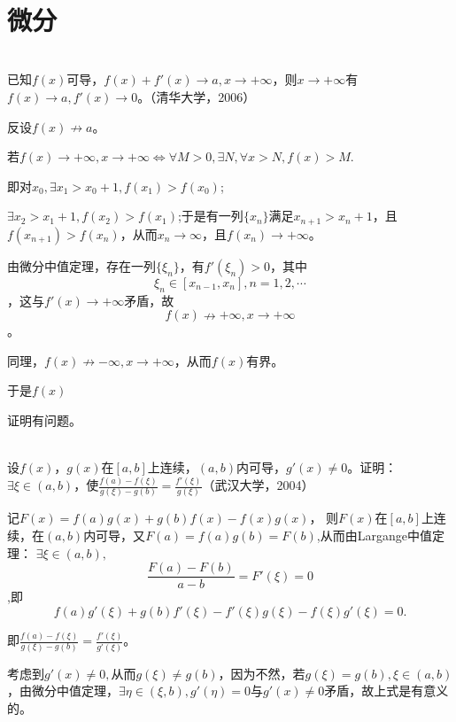   \hfill\\



\section{微分}
  \begin{example}
  \hfill\\
   已知$f(x)$可导，$f(x)+f'(x)\rightarrow a,x\rightarrow+\infty$，则$x\rightarrow+\infty$有$f(x)\rightarrow a,f'(x)\rightarrow0$。（清华大学，2006）
  
  反设$f(x)\nrightarrow a$。
  
  若$f(x)\rightarrow+\infty,x\rightarrow+\infty\Leftrightarrow\forall M>0,\exists N,\forall x>N,f(x)>M.$
  
  即对$x_0,\exists x_1>x_0+1,f(x_1)>f(x_0)$;
  
  $\exists x_2>x_1+1,f(x_2)>f(x_1)$;于是有一列$\{x_n\}$满足$x_{n+1}>x_n+1$，且$f(x_{n+1})>f(x_n)$，从而$x_n\rightarrow\infty$，且$f(x_n)\rightarrow+\infty$。
  
  由微分中值定理，存在一列$\{\xi_n\}$，有$f'(\xi_n)>0$，其中$$\xi_n\in[x_{n-1},x_n],n=1,2,\cdots$$，这与$f'(x)\rightarrow+\infty$矛盾，故$$f(x)\nrightarrow+\infty,x\rightarrow+\infty$$。
  
  同理，$f(x)\nrightarrow-\infty,x\rightarrow+\infty$，从而$f(x)$有界。
  
  于是$f(x)$
  
  证明有问题。
  \end{example}
  \begin{example}
  \hfill\\
   设$f(x)$，$g(x)$在$[a,b]$上连续，$(a,b)$内可导，$g'(x)\neq0$。证明：$\exists\xi\in(a,b)$，使$\frac{f(a)-f(\xi)}{g(\xi)-g(b)}=\frac{f'(\xi)}{g(\xi)}$（武汉大学，2004）
  
  记$F(x)=f(a)g(x)+g(b)f(x)-f(x)g(x)$，
  则$F(x)$在$[a,b]$上连续，在$(a,b)$内可导，又$F(a)=f(a)g(b)=F(b)$,从而由Largange中值定理：
  $\exists\xi\in(a,b),$$$\frac{F(a)-F(b)}{a-b}=F'(\xi)=0$$,即$$f(a)g'(\xi)+g(b)f'(\xi)-f'(\xi)g(\xi)-f(\xi)g'(\xi)=0.$$
  
  即$\frac{f(a)-f(\xi)}{g(\xi)-g(b)}=\frac{f'(\xi)}{g'(\xi)}$。
  
  考虑到$g'(x)\neq 0,$从而$g(\xi)\neq g(b)$，因为不然，若$g(\xi)=g(b),\xi\in(a,b)$，由微分中值定理，$\exists\eta\in(\xi,b),g'(\eta)=0$与$g'(x)\neq0$矛盾，故上式是有意义的。
  \end{example}
